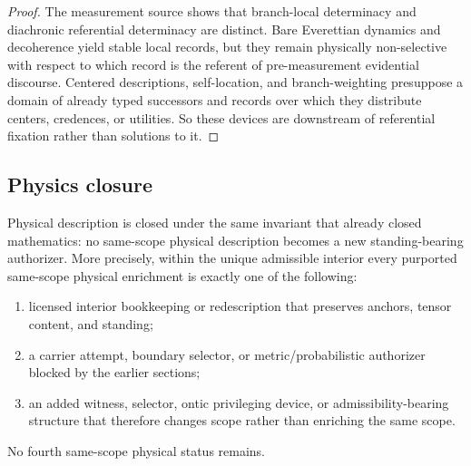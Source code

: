 \begin{proof}
The measurement source shows that branch-local determinacy and diachronic referential determinacy are distinct. Bare Everettian dynamics and decoherence yield stable local records, but they remain physically non-selective with respect to which record is the referent of pre-measurement evidential discourse. Centered descriptions, self-location, and branch-weighting presuppose a domain of already typed successors and records over which they distribute centers, credences, or utilities. So these devices are downstream of referential fixation rather than solutions to it.
\end{proof}

\subsection{Physics closure}

\begin{theorem}
\label{thm:physics-closure}
Physical description is closed under the same invariant that already closed mathematics: no same-scope physical description becomes a new standing-bearing authorizer. More precisely, within the unique admissible interior every purported same-scope physical enrichment is exactly one of the following:
\begin{enumerate}
  \item licensed interior bookkeeping or redescription that preserves anchors, tensor content, and standing;
  \item a carrier attempt, boundary selector, or metric/probabilistic authorizer blocked by the earlier sections;
  \item an added witness, selector, ontic privileging device, or admissibility-bearing structure that therefore changes scope rather than enriching the same scope.
\end{enumerate}
No fourth same-scope physical status remains.
\end{theorem}

